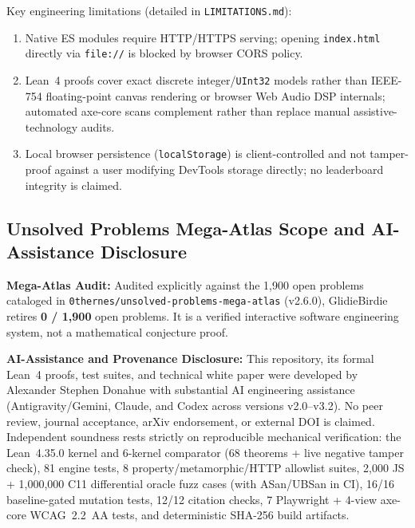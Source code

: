 \documentclass[11pt,letterpaper]{article}
\theoremstyle{remark}
\begin{document}
Key engineering limitations (detailed in \texttt{LIMITATIONS.md}):
\begin{enumerate}[leftmargin=1.8em, itemsep=1pt]
  \item Native ES modules require HTTP/HTTPS serving; opening \texttt{index.html} directly via \texttt{file://} is blocked by browser CORS policy.
  \item Lean~4 proofs cover exact discrete integer/\texttt{UInt32} models rather than IEEE-754 floating-point canvas rendering or browser Web Audio DSP internals; automated axe-core scans complement rather than replace manual assistive-technology audits.
  \item Local browser persistence (\texttt{localStorage}) is client-controlled and not tamper-proof against a user modifying DevTools storage directly; no leaderboard integrity is claimed.
\end{enumerate}

\subsection{Unsolved Problems Mega-Atlas Scope and AI-Assistance Disclosure}
\textbf{Mega-Atlas Audit:} Audited explicitly against the 1,900 open problems cataloged in \texttt{0thernes/\allowbreak unsolved-\allowbreak problems-\allowbreak mega-\allowbreak atlas} (v2.6.0), GlidieBirdie retires \textbf{0 / 1,900} open problems. It is a verified interactive software engineering system, not a mathematical conjecture proof.

\textbf{AI-Assistance and Provenance Disclosure:} This repository, its formal Lean~4 proofs, test suites, and technical white paper were developed by Alexander Stephen Donahue with substantial AI engineering assistance (Antigravity/Gemini, Claude, and Codex across versions v2.0--v3.2). No peer review, journal acceptance, arXiv endorsement, or external DOI is claimed. Independent soundness rests strictly on reproducible mechanical verification: the Lean~4.35.0 kernel and 6-kernel comparator (68 theorems + live negative tamper check), 81 engine tests, 8 property/metamorphic/HTTP allowlist suites, 2,000 JS + 1,000,000 C11 differential oracle fuzz cases (with ASan/UBSan in CI), 16/16 baseline-gated mutation tests, 12/12 citation checks, 7 Playwright + 4-view axe-core WCAG~2.2~AA tests, and deterministic SHA-256 build artifacts.

\FloatBarrier


\end{document}
